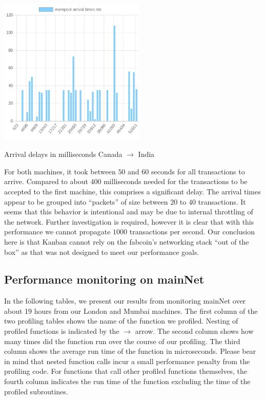 \documentclass{article}
\begin{document}
\begin{table}
	\begin{center}
		\includegraphics[width = 7cm]{./images/mempoolArrivals13_232_20_11.png}
	\end{center}
	\caption{\label{tableArrivalTimesToMumbai} Arrival delays in milliseconds Canada $ \to$ India}
\end{table}

For both machines, it took between $50$ and $60$ seconds for all transactions to arrive. Compared to about $400$ milliseconds needed for the transactions to be accepted to the first machine, this comprises a significant delay. The arrival times appear to be grouped into ``packets'' of size between $20$ to $40$ 
transactions. It seems that this behavior is intentional and may be due to internal throttling of the network. Further investigation is required, however it is clear that with this performance we cannot propagate $1000$ transactions per second. Our conclusion here is that Kanban cannot rely on the fabcoin's networking stack ``out of the box'' as that was not designed to meet our performance goals. 

\subsection{Performance monitoring on mainNet}
In the following tables, we present our results from monitoring mainNet over about 19 hours from our London and Mumbai machines. The first column of the two profiling tables shows the name of the function we profiled. Nesting of profiled functions is indicated by the $ \to $ arrow. The second column shows how many times did the function run over the course of our profiling. The third column shows the average run time of the function in microseconds. Please bear in mind that nested function calls incur a small performance penalty from the profiling code. For functions that call other profiled functions themselves, the fourth column indicates the run time of the function excluding the time of the profiled subroutines.
\end{document}
